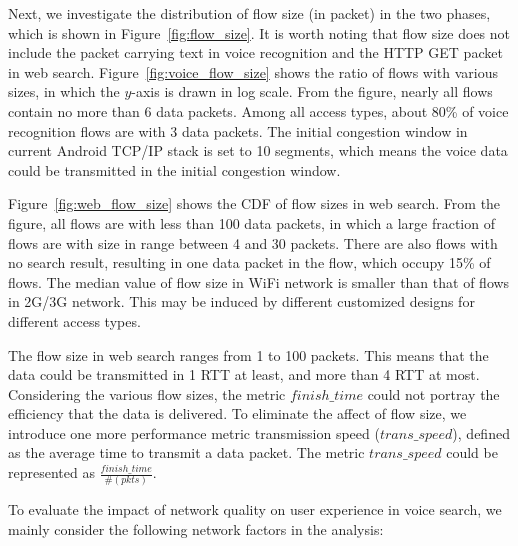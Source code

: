 Next, we investigate the distribution of flow size (in packet) in the two phases, which is shown in Figure~\ref{fig:flow_size}. It is worth noting that flow size does not include the packet carrying text in voice recognition and the HTTP GET packet in web search. Figure~\ref{fig:voice_flow_size} shows the ratio of flows with various sizes, in which the $y$-axis is drawn in log scale. From the figure, nearly all flows contain no more than 6 data packets. Among all access types, about 80\% of voice recognition flows are with 3 data packets. The initial congestion window in current Android TCP/IP stack is set to 10 segments\cite{dukkipati2010argument}, which means the voice data could be transmitted in the initial congestion window.

Figure~\ref{fig:web_flow_size} shows the CDF of flow sizes in web search. From the figure, all flows are with less than 100 data packets, in which a large fraction of flows are with size in range between 4 and 30 packets. There are also flows with no search result, resulting in one data packet in the flow, which occupy 15\% of flows. The median value of flow size in WiFi network is smaller than that of flows in 2G/3G network. This may be induced by different customized designs for different access types.

The flow size in web search ranges from 1 to 100 packets. This means that the data could be transmitted in 1 RTT at least, and more than 4 RTT at most. Considering the various flow sizes, the metric $finish\_time$ could not portray the efficiency that the data is delivered. To eliminate the affect of flow size, we introduce one more performance metric transmission speed ($trans\_speed$), defined as the average time to transmit a data packet. The metric $trans\_speed$ could be represented as $\frac{finish\_time}{\#(pkts)}$.

To evaluate the impact of network quality on user experience in voice search, we mainly consider the following network factors in the analysis:


